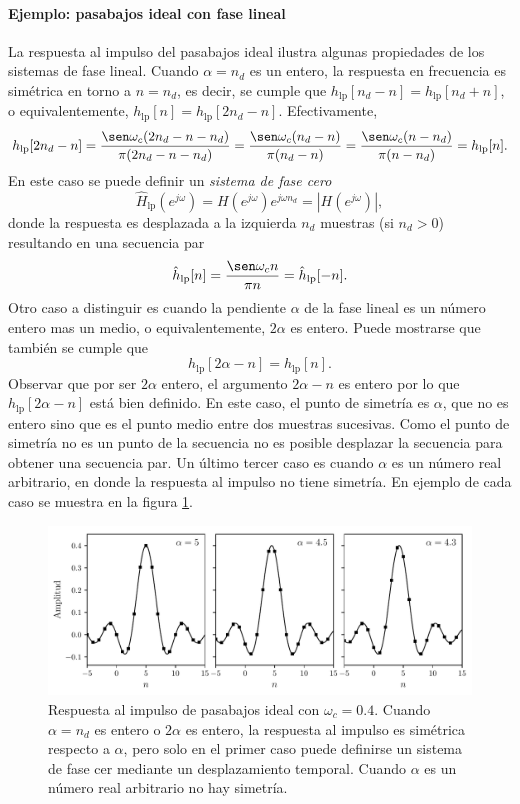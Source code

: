 \documentclass[a4paper]{report}
\begin{document}
\paragraph{Ejemplo: pasabajos ideal con fase lineal} La respuesta al impulso del pasabajos ideal ilustra algunas propiedades de los sistemas de fase lineal. Cuando \(\alpha=n_d\) es un entero, la respuesta en frecuencia es simétrica en torno a \(n=n_d\), es decir, se cumple que \(h_\textrm{lp}[n_d-n]=h_\textrm{lp}[n_d+n]\), o equivalentemente, \(h_\textrm{lp}[n]=h_\textrm{lp}[2n_d-n]\). Efectivamente,
\[
 h_\textrm{lp}[2n_d-n]=\frac{\sen\omega_c(2n_d-n-n_d)}{\pi(2n_d-n-n_d)}=\frac{\sen\omega_c(n_d-n)}{\pi(n_d-n)}
 =\frac{\sen\omega_c(n-n_d)}{\pi(n-n_d)}=h_\textrm{lp}[n].
\]
En este caso se puede definir un \emph{sistema de fase cero}
\[
 \hat{H}_\textrm{lp}(e^{j\omega})=H(e^{j\omega})e^{j\omega n_d}=|H(e^{j\omega})|,
\]
donde la respuesta es desplazada a la izquierda \(n_d\) muestras (si \(n_d>0\)) resultando en una secuencia par
\[
 \hat{h}_\textrm{lp}[n]=\frac{\sen\omega_c n}{\pi n}=\hat{h}_\textrm{lp}[-n].
\]
Otro caso a distinguir es cuando la pendiente \(\alpha\) de la fase lineal es un número entero mas un medio, o equivalentemente, \(2\alpha\) es entero. Puede mostrarse que también se cumple que 
\[
 h_\textrm{lp}[2\alpha-n]=h_\textrm{lp}[n].
\]
Observar que por ser \(2\alpha\) entero, el argumento \(2\alpha-n\) es entero por lo que \(h_\textrm{lp}[2\alpha-n]\) está bien definido. En este caso, el punto de simetría es \(\alpha\), que no es entero sino que es el punto medio entre dos muestras sucesivas. Como el punto de simetría no es un punto de la secuencia no es posible desplazar la secuencia para obtener una secuencia par. 
Un último tercer caso es cuando \(\alpha\) es un número real arbitrario, en donde la respuesta al impulso no tiene simetría. En ejemplo de cada caso se muestra en la figura \ref{fig:transform_analysis_example_05_14_linear_phase}.
\begin{figure}[!htb]
 \begin{center}
 \includegraphics[width=1\textwidth]{figuras/transform_analysis_example_05_14_linear_phase.pdf}
 \caption{\label{fig:transform_analysis_example_05_14_linear_phase} Respuesta al impulso de pasabajos ideal con \(\omega_c=0.4\). Cuando \(\alpha=n_d\) es entero o \(2\alpha\) es entero, la respuesta al impulso es simétrica respecto a \(\alpha\), pero solo en el primer caso puede definirse un sistema de fase cer mediante un desplazamiento temporal. Cuando \(\alpha\) es un número real arbitrario no hay simetría.}
 \end{center}
\end{figure}
\end{document}
